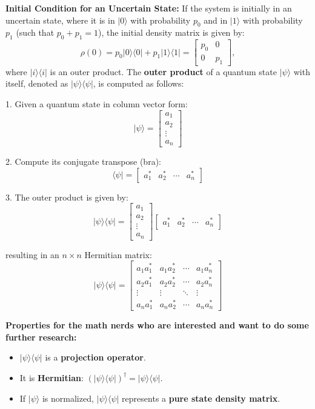 \documentclass[12pt]{article}
\newcommand{\bra}[1]{\langle #1 |}
\newcommand{\ket}[1]{| #1 \rangle}
\begin{document}
\textbf{Initial Condition for an Uncertain State:} If the system is initially in an uncertain state, where it is in $|0\rangle$ with probability $p_0$ and in $|1\rangle$ with probability $p_1$ (such that $p_0 + p_1 = 1$), the initial density matrix is given by:
\begin{equation*}
    \rho(0) = p_0 |0\rangle \langle 0| + p_1 |1\rangle \langle 1| = \begin{bmatrix} p_0 & 0 \\ 0 & p_1 \end{bmatrix},
\end{equation*}
where $\ket{i}\bra{i}$ is an outer product. The \textbf{outer product} of a quantum state \( |\psi\rangle \) with itself, denoted as \( |\psi\rangle \langle \psi| \), is computed as follows:

1. Given a quantum state in column vector form:
   \[
   |\psi\rangle = \begin{bmatrix} a_1 \\ a_2 \\ \vdots \\ a_n \end{bmatrix}
   \]
   
2. Compute its conjugate transpose (bra):
   \[
   \langle \psi| = \begin{bmatrix} a_1^* & a_2^* & \cdots & a_n^* \end{bmatrix}
   \]

3. The outer product is given by:
   \[
   |\psi\rangle \langle \psi| =
   \begin{bmatrix} a_1 \\ a_2 \\ \vdots \\ a_n \end{bmatrix}
   \begin{bmatrix} a_1^* & a_2^* & \cdots & a_n^* \end{bmatrix}
   \]

   resulting in an \( n \times n \) Hermitian matrix:
   \[
   |\psi\rangle \langle \psi| =
   \begin{bmatrix}
   a_1 a_1^* & a_1 a_2^* & \cdots & a_1 a_n^* \\
   a_2 a_1^* & a_2 a_2^* & \cdots & a_2 a_n^* \\
   \vdots & \vdots & \ddots & \vdots \\
   a_n a_1^* & a_n a_2^* & \cdots & a_n a_n^*
   \end{bmatrix}
   \]

\textbf{Properties for the math nerds who are interested and want to do some further research:}
\begin{itemize}
    \item \( |\psi\rangle \langle \psi| \) is a \textbf{projection operator}.
    \item It is \textbf{Hermitian}: \( (|\psi\rangle \langle \psi|)^\dagger = |\psi\rangle \langle \psi| \).
    \item If \( |\psi\rangle \) is normalized, \( |\psi\rangle \langle \psi| \) represents a \textbf{pure state density matrix}.

\end{itemize}
\end{document}
